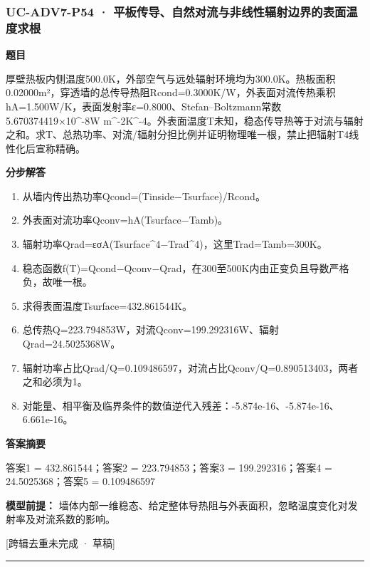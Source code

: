 \documentclass[UTF8,11pt,a4paper]{ctexart}
\begin{document}
\subsubsection*{UC-ADV7-P54 · 平板传导、自然对流与非线性辐射边界的表面温度求根}
\noindent\textbf{题目}\par
厚壁热板内侧温度500.0K，外部空气与远处辐射环境均为300.0K。热板面积0.02000m²，穿透墙的总传导热阻Rcond=0.3000K/W，外表面对流传热乘积hA=1.500W/K，表面发射率ε=0.8000、Stefan–Boltzmann常数5.670374419×10\textasciicircum{}-8W m\textasciicircum{}-2K\textasciicircum{}-4。外表面温度T未知，稳态传导热等于对流与辐射之和。求T、总热功率、对流/辐射分担比例并证明物理唯一根，禁止把辐射T4线性化后宣称精确。\par
\medskip\noindent\textbf{分步解答}
\begin{enumerate}
\item 从墙内传出热功率Qcond=(Tinside−Tsurface)/Rcond。
\item 外表面对流功率Qconv=hA(Tsurface−Tamb)。
\item 辐射功率Qrad=εσA(Tsurface\textasciicircum{}4−Trad\textasciicircum{}4)，这里Trad=Tamb=300K。
\item 稳态函数f(T)=Qcond−Qconv−Qrad，在300至500K内由正变负且导数严格负，故唯一根。
\item 求得表面温度Tsurface=432.861544K。
\item 总传热Q=223.794853W，对流Qconv=199.292316W、辐射Qrad=24.5025368W。
\item 辐射功率占比Qrad/Q=0.109486597，对流占比Qconv/Q=0.890513403，两者之和必须为1。
\item 对能量、相平衡及临界条件的数值逆代入残差：-5.874e-16、-5.874e-16、6.661e-16。
\end{enumerate}
\noindent\textbf{答案摘要}\par
答案1 = 432.861544；答案2 = 223.794853；答案3 = 199.292316；答案4 = 24.5025368；答案5 = 0.109486597\par
\noindent\textbf{模型前提：}
墙体内部一维稳态、给定整体导热阻与外表面积，忽略温度变化对发射率及对流系数的影响。\par
\noindent\textcolor{red!65!black}{[跨辑去重未完成 · 草稿]} \par
\medskip\hrule\medskip
{}
\end{document}

